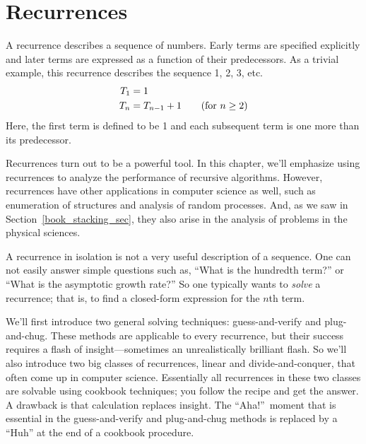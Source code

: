 \chapter{Recurrences}\label{chap:recurrences}


A recurrence describes a sequence of numbers.  Early terms are
specified explicitly and later terms are expressed as a function of
their predecessors.  As a trivial example, this recurrence describes
the sequence 1, 2, 3, etc.
\begin{align*}
T_1 & = 1 \\
T_n & = T_{n-1} + 1 \text{\qquad (for $n \geq 2$)}
\end{align*}
Here, the first term is defined to be 1 and each subsequent term is
one more than its predecessor.

Recurrences turn out to be a powerful tool.  In this chapter, we'll
emphasize using recurrences to analyze the performance of recursive
algorithms.  However, recurrences have other applications in computer
science as well, such as enumeration of structures and analysis of
random processes.  And, as we saw in Section~\ref{book_stacking_sec},
they also arise in the analysis of problems in the physical sciences.

A recurrence in isolation is not a very useful description of a
sequence.  One can not easily answer simple questions such as, ``What
is the hundredth term?'' or ``What is the asymptotic growth rate?''
So one typically wants to \emph{solve} a recurrence; that is, to find a
closed-form expression for the $n$th term.

We'll first introduce two general solving techniques: guess-and-verify
and plug-and-chug.  These methods are applicable to every recurrence,
but their success requires a flash of insight---sometimes an
unrealistically brilliant flash.  So we'll also introduce two big
classes of recurrences, linear and divide-and-conquer, that often come
up in computer science.  Essentially all recurrences in these two
classes are solvable using cookbook techniques; you follow the recipe
and get the answer.  A drawback is that calculation replaces insight.
The ``Aha!''\  moment that is essential in the guess-and-verify and
plug-and-chug methods is replaced by a ``Huh'' at the end of a
cookbook procedure.

